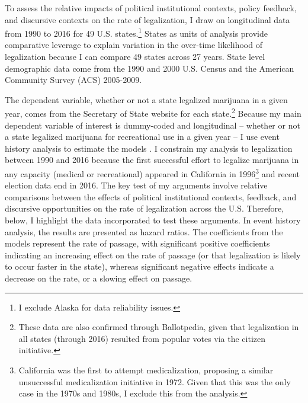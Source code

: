 To assess the relative impacts of political institutional contexts, policy feedback, and discursive contexts on the rate of legalization, I draw on longitudinal data from 1990 to 2016 for 49 U.S. states.\footnote{I exclude Alaska for data reliability issues.} %
States as units of analysis provide comparative leverage to explain variation in the over-time likelihood of legalization because I can compare 49 states across 27 years. %
State level demographic data come from the 1990 and 2000 U.S. Census and the American Community Survey (ACS) 2005-2009. %

The dependent variable, whether or not a state legalized marijuana in a given year, comes from the Secretary of State website for each state.\footnote{These data are also confirmed through Ballotpedia, given that legalization in all states (through 2016) resulted from popular votes via the citizen initiative.} Because my main dependent variable of interest is dummy-coded and longitudinal -- whether or not a state legalized marijuana for recreational use in a given year -- I use event history analysis to estimate the models \citep{box-steffensmeier_and_jones_1997,box-steffensmeier_and_jones_2004}. I constrain my analysis to legalization between 1990 and 2016 because the first successful effort to legalize marijuana in any capacity (medical or recreational) appeared in California in 1996\footnote{California was the first to attempt medicalization, proposing a similar unsuccessful medicalization initiative in 1972. Given that this was the only case in the 1970s and 1980s, I exclude this from the analysis.} and recent election data end in 2016. The key test of my arguments involve relative comparisons between the effects of political institutional contexts, feedback, and discursive opportunities on the rate of legalization across the U.S. Therefore, below, I highlight the data incorporated to test these arguments. In event history analysis, the results are presented as hazard ratios. The coefficients from the models represent the rate of passage, with significant positive coefficients indicating an increasing effect on the rate of passage (or that legalization is likely to occur faster in the state), whereas significant negative effects indicate a decrease on the rate, or a slowing effect on passage. 



